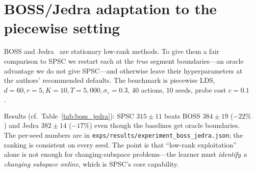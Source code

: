 \documentclass{article}
\begin{document}
\section{BOSS/Jedra adaptation to the piecewise setting}
\label{app:boss_jedra_detail}

BOSS and Jedra~\citep{pmlr-v235-jedra24a} are stationary low-rank
methods. To give them a fair comparison to SPSC we restart each at
the \emph{true} segment boundaries---an oracle advantage we do not
give SPSC---and otherwise leave their hyperparameters at the authors'
recommended defaults. The benchmark is piecewise LDS,
$d{=}60, r{=}5, K{=}10, T{=}5{,}000, \sigma_\varepsilon{=}0.3$, 40
actions, 10 seeds, probe cost $c{=}0.1$.

Results (cf.\ Table~\ref{tab:boss_jedra}): SPSC $315{\pm}11$ beats
BOSS $384{\pm}19$ ($-22\%$) and Jedra $382{\pm}14$ ($-17\%$) even
though the baselines get oracle boundaries.  The per-seed numbers are
in \texttt{exps/results/experiment\_boss\_jedra.json}; the ranking is
consistent on every seed.  The point is that ``low-rank exploitation''
alone is not enough for changing-subspace problems---the learner must
\emph{identify a changing subspace online}, which is SPSC's core
capability.
\end{document}
